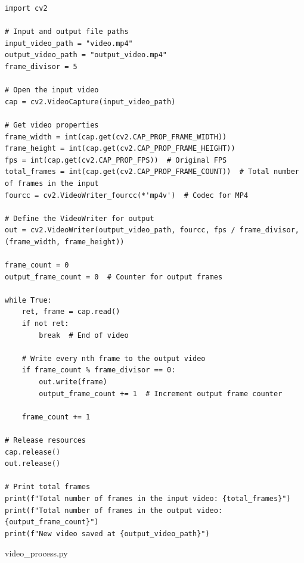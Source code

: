 \documentclass{article}
\begin{document}
\begin{listing}[H]
    \begin{verbatim}
import cv2

# Input and output file paths
input_video_path = "video.mp4"
output_video_path = "output_video.mp4"
frame_divisor = 5

# Open the input video
cap = cv2.VideoCapture(input_video_path)

# Get video properties
frame_width = int(cap.get(cv2.CAP_PROP_FRAME_WIDTH))
frame_height = int(cap.get(cv2.CAP_PROP_FRAME_HEIGHT))
fps = int(cap.get(cv2.CAP_PROP_FPS))  # Original FPS
total_frames = int(cap.get(cv2.CAP_PROP_FRAME_COUNT))  # Total number of frames in the input
fourcc = cv2.VideoWriter_fourcc(*'mp4v')  # Codec for MP4

# Define the VideoWriter for output
out = cv2.VideoWriter(output_video_path, fourcc, fps / frame_divisor, (frame_width, frame_height))

frame_count = 0
output_frame_count = 0  # Counter for output frames

while True:
    ret, frame = cap.read()
    if not ret:
        break  # End of video

    # Write every nth frame to the output video
    if frame_count % frame_divisor == 0:
        out.write(frame)
        output_frame_count += 1  # Increment output frame counter
    
    frame_count += 1

# Release resources
cap.release()
out.release()

# Print total frames
print(f"Total number of frames in the input video: {total_frames}")
print(f"Total number of frames in the output video: {output_frame_count}")
print(f"New video saved at {output_video_path}")
    \end{verbatim}
\caption{video\_process.py}
\label{code:videoprocess}
\end{listing}
\end{document}
